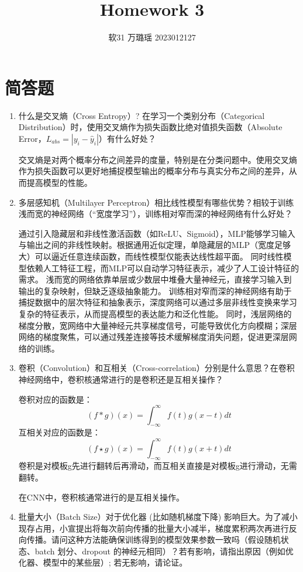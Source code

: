\documentclass[a4paper,9pt]{article}
\begin{document}
\title{Homework 3}
\author{软31 万璐瑶 2023012127}
\maketitle
\section{简答题}
\begin{enumerate}
    \item 什么是交叉熵（Cross Entropy）? 在学习一个类别分布（Categorical Distribution）时，使用交叉熵作为损失函数比绝对值损失函数（Absolute Error，$L_{abs} = |y_i - \hat{y}_i|$）有什么好处？
    
    交叉熵是对两个概率分布之间差异的度量，特别是在分类问题中。使用交叉熵作为损失函数可以更好地捕捉模型输出的概率分布与真实分布之间的差异，从而提高模型的性能。

    \item 多层感知机（Multilayer Perceptron）相比线性模型有哪些优势？相较于训练浅而宽的神经网络（“宽度学习”），训练相对窄而深的神经网络有什么好处？
     
    通过引入隐藏层和非线性激活函数（如ReLU、Sigmoid），MLP能够学习输入与输出之间的非线性映射。根据通用近似定理，单隐藏层的MLP（宽度足够大）可以逼近任意连续函数，而线性模型仅能表达线性超平面。
    同时线性模型依赖人工特征工程，而MLP可以自动学习特征表示，减少了人工设计特征的需求。
    浅而宽的网络依靠单层或少数层中堆叠大量神经元，直接学习输入到输出的复杂映射，但缺乏逐级抽象能力。
    训练相对窄而深的神经网络有助于捕捉数据中的层次特征和抽象表示，深度网络可以通过多层非线性变换来学习复杂的特征表示，从而提高模型的表达能力和泛化性能。
    同时，浅层网络的梯度分散，宽网络中大量神经元共享梯度信号，可能导致优化方向模糊；深层网络的梯度聚焦，可以通过残差连接等技术缓解梯度消失问题，促进更深层网络的训练。
    
    \item 卷积（Convolution）和互相关（Cross-correlation）分别是什么意思？在卷积神经网络中，卷积核通常进行的是卷积还是互相关操作？
    
    卷积对应的函数是：
    $$(f*g)(x) = \int_{-\infty}^{\infty} f(t) g(x - t) dt$$
    互相关对应的函数是：
    $$(f \star g)(x) = \int_{-\infty}^{\infty} f(t) g(x + t) dt$$
    卷积是对模板g先进行翻转后再滑动，而互相关直接是对模板g进行滑动，无需翻转。

    在CNN中，卷积核通常进行的是互相关操作。

    \item 批量大小（Batch Size）对于优化器 (比如随机梯度下降) 影响巨大。为了减小现存占用，小宣提出将每次前向传播的批量大小减半，梯度累积两次再进行反向传播。请问这种方法能确保训练得到的模型效果参数一致吗（假设随机状态、batch 划分、dropout 的神经元相同）？若有影响，请指出原因（例如优化器、模型中的某些层）; 若无影响，请论证。
    


\end{enumerate}
\end{document}

